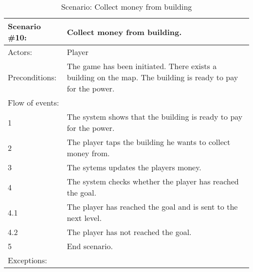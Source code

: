 \begin{table}
	\begin{tabular}{| l | p{10cm} |}
		\hline
		\rowcolor{lightgray}
		{\bf Scenario \#10:} & {\bf Collect money from building.} \\ \hline
		Actors: & Player \\ \hline
		Preconditions: & The game has been initiated. There exists a building on the map. The building is ready to pay for the power. \\ \hline
		\rowcolor{lightergray}
		Flow of events: & \\ \hline
		1 & The system shows that the building is ready to pay for the power. \\ \hline
		2 & The player taps the building he wants to collect money from. \\ \hline
		3 & The sytems updates the players money. \\ \hline
		4 & The system checks whether the player has reached the goal. \\ \hline
		4.1 & The player has reached the goal and is sent to the next level. \\ \hline
		4.2 & The player has not reached the goal. \\ \hline
		5 & End scenario. \\ \hline
		\rowcolor{lightergray}
		Exceptions: & \\ \hline
	\end{tabular}
\caption{Scenario: Collect money from building}
\end{table}
